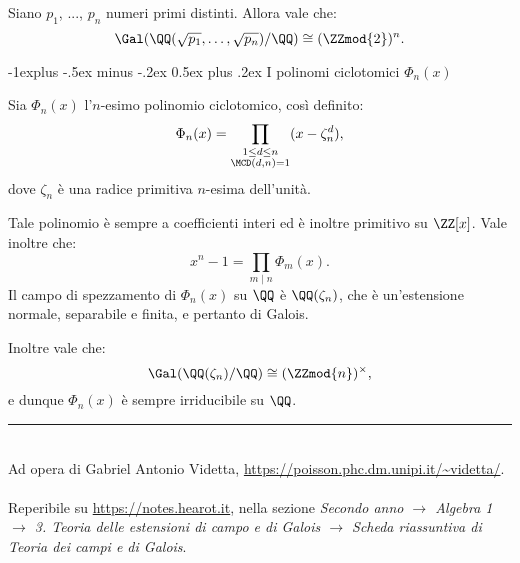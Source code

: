 \documentclass[10pt,landscape]{article}
\makeatletter
\renewcommand{\subsection}{\@startsection{subsection}{2}{0mm}%
	{-1explus -.5ex minus -.2ex}%
	{0.5ex plus .2ex}%
	{\normalfont\normalsize\bfseries}}
\makeatother
\begin{document}
\begin{multicols}{3}
		Siano $p_1$, ..., $p_n$ numeri primi distinti.
		Allora
		vale che:
		\[ \Gal(\QQ(\sqrt{p_1}, \ldots, \sqrt{p_n})/\QQ) \cong (\ZZmod{2})^n. \]
		
		\subsection{I polinomi ciclotomici $\Phi_n(x)$}
		
		Sia $\Phi_n(x)$ l'$n$-esimo polinomio ciclotomico, così definito:
		\[ \Phi_n(x) = \prod_{\substack{1 \leq d \leq n \\ \MCD(d, n) = 1}} (x - \zeta_n^d), \]
		dove $\zeta_n$ è una radice primitiva $n$-esima dell'unità. \medskip
		
		
		Tale polinomio è sempre a coefficienti interi ed è inoltre primitivo
		su $\ZZ[x]$. Vale inoltre che:
		\[ x^n - 1 = \prod_{m \mid n} \Phi_m(x). \]
		Il campo di spezzamento di $\Phi_n(x)$ su $\QQ$ è
		$\QQ(\zeta_n)$, che è un'estensione normale, separabile e finita,
		e pertanto di Galois. \medskip
		
		
		Inoltre vale che:
		\[ \Gal(\QQ(\zeta_n)/\QQ) \cong (\ZZmod{n})^\times, \]
		e dunque $\Phi_n(x)$ è sempre irriducibile su $\QQ$.
		
		\vfill
		\hrule
		~\\
		Ad opera di Gabriel Antonio Videtta, \url{https://poisson.phc.dm.unipi.it/~videtta/}.
		~\\Reperibile su
		\url{https://notes.hearot.it}, nella sezione \textit{Secondo anno $\to$ Algebra 1 $\to$ 3. Teoria delle estensioni di campo e di Galois $\to$ Scheda riassuntiva di Teoria dei campi e di Galois}.
	\end{multicols}
	
\end{document}
